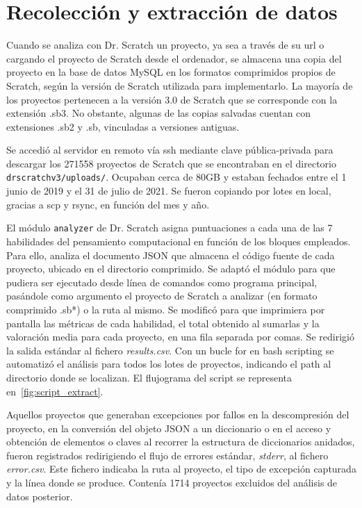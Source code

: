 \documentclass[a4paper, 12pt]{book}
\begin{document}
\section{Recolección y extracción de datos}  
\label{sec:collect_data}

Cuando se analiza con Dr. Scratch un proyecto, ya sea a través de su url o cargando el proyecto de Scratch desde el ordenador, se almacena una copia del proyecto en la base de datos MySQL en los formatos comprimidos propios de Scratch, según la versión de Scratch utilizada para implementarlo. La mayoría de los proyectos pertenecen a la versión 3.0 de Scratch que se corresponde con la extensión .sb3. No obstante, algunas de las copias salvadas cuentan con extensiones .sb2 y .sb, vinculadas a versiones antiguas. 

Se accedió al servidor en remoto vía ssh mediante clave pública-privada para descargar los 271558 proyectos de Scratch que se encontraban en el directorio \texttt{drscratchv3/uploads/}. Ocupaban cerca de 80GB y estaban fechados entre el 1 junio de 2019 y el 31 de julio de 2021. Se fueron copiando por lotes en local, gracias a scp y rsync, en función del mes y año. 

El módulo \texttt{analyzer} de Dr. Scratch asigna puntuaciones a cada una de las 7 habilidades del pensamiento computacional en función de los bloques empleados. Para ello, analiza el documento JSON que almacena el código fuente de cada proyecto, ubicado en el directorio comprimido. Se adaptó el módulo para que pudiera ser ejecutado desde línea de comandos como programa principal, pasándole como argumento el proyecto de Scratch a analizar (en formato comprimido .sb*) o la ruta al mismo. Se modificó para que imprimiera por pantalla las métricas de cada habilidad, el total obtenido al sumarlas y la valoración media para cada proyecto, en una fila separada por comas. Se redirigió la salida estándar al fichero \emph{results.csv}.  
Con un bucle for en bash scripting se automatizó el análisis para todos los lotes de proyectos, indicando el path al directorio donde se localizan. El flujograma del script se representa en~\ref{fig:script_extract}.

Aquellos proyectos que generaban excepciones por fallos en la descompresión del proyecto, en la conversión del objeto JSON a un diccionario o en el acceso y obtención de elementos o claves al recorrer la estructura de diccionarios anidados, fueron registrados redirigiendo el flujo de errores estándar, \emph{stderr}, al fichero \emph{error.csv}. Este fichero indicaba la ruta al proyecto, el tipo de excepción capturada y la línea donde se produce. Contenía 1714 proyectos excluidos del análisis de datos posterior.
\end{document}
